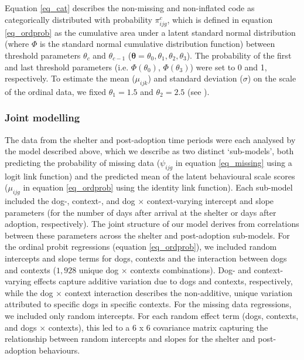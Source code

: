 \documentclass[12pt]{article}
\begin{document}
Equation \ref{eq_cat} describes the non-missing and non-inflated code as categorically distributed with probability $\pi_{ijg}^c$, which is defined in equation \ref{eq_ordprob} as the cumulative area under a latent standard normal distribution (where $\Phi$ is the standard normal cumulative distribution function) between threshold parameters $\theta_{c}$ and $\theta_{c-1}$ ($\boldsymbol{\theta} = {\theta_{0}, \theta_{1}, \theta_{2}, \theta_{3}}$). The probability of the first and last threshold parameters (i.e. $\Phi({\theta_{0}})$, $\Phi({\theta_{3}})$) were set to 0 and 1, respectively. To estimate the mean ($\mu_{ijk}$) and standard deviation ($\sigma$) on the scale of the ordinal data, we fixed $\theta_{1} = 1.5$ and $\theta_{2} = 2.5$ (see \cite{kruschke2014}).

\subsubsection{Joint modelling}
The data from the shelter and post-adoption time periods were each analysed by the model described above, which we describe as two distinct `sub-models', both predicting the probability of missing data ($\psi_{ijg}$ in equation \ref{eq_missing} using a logit link function) and the predicted mean of the latent behavioural scale scores ($\mu_{ijg}$ in equation \ref{eq_ordprob} using the identity link function). Each sub-model included the dog-, context-, and dog $\times$ context-varying intercept and slope parameters (for the number of days after arrival at the shelter or days after adoption, respectively). The joint structure of our model derives from correlations between these parameters across the shelter and post-adoption sub-models. For the ordinal probit regressions (equation \ref{eq_ordprob}), we included random intercepts and slope terms for dogs, contexts and the interaction between dogs and contexts ($1,928$ unique dog $\times$ contexts combinations). Dog- and context-varying effects capture additive variation due to dogs and contexts, respectively, while the dog $\times$ context interaction describes the non-additive, unique variation attributed to specific dogs in specific contexts. For the missing data regressions, we included only random intercepts. For each random effect term (dogs, contexts, and dogs $\times$ contexts), this led to a 6 x 6 covariance matrix capturing the relationship between random intercepts and slopes for the shelter and post-adoption behaviours.
\end{document}
